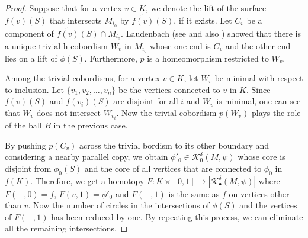 \documentclass[a4paper]{amsart}
\theoremstyle{definition}
\theoremstyle{remark}
\numberwithin{equation}{section}
\begin{document}
\begin{proof}
Suppose that for a vertex $v\in K$, we denote the lift of the surface $f(v)(S)$  that intersects $M_{i_0}$ by $\widetilde{f(v)}(S)$, if it exists. Let $C_v$ be a component of $\widetilde{f(v)}(S)\cap M_{i_0}$. Laudenbach (see \cite[Corollary II.4.2]{MR0356056} and also \cite[page 8]{hatcher1999spaces}) showed that  there is a unique trivial h-cobordism $W_v$ in $M_{i_0}$ whose  one end is $C_v$ and the other end lies on a lift of $\phi(S)$. Furthermore, $p$ is a homeomorphism restricted to $W_v$.

Among the trivial cobordisms, for a vertex $v\in K$, let $W_v$ be  minimal with respect to inclusion.  Let $\{v_1,v_2,\dots,v_n\}$ be the vertices connected to $v$ in $K$. Since $f(v)(S)$ and $f(v_i)(S)$ are disjoint for all $i$ and $W_v$ is minimal, one can see that $W_v$ does not intersect $W_{v_i}$. Now the trivial cobordism $p(W_v)$ plays the role of the ball $B$ in the previous case. 

By pushing $p(C_v)$ across the trivial bordism to its other boundary and considering a nearby parallel copy, we obtain $\phi'_0\in \mathcal{K}^{\delta}_{0}(M,\psi)$ whose core is disjoint from $\phi_0(S)$ and the core of all vertices that are connected to $\phi_0$ in $f(K)$.  Therefore, we get a homotopy $F:K\times [0,1]\to |\mathcal{K}^{\delta}_{\bullet}(M,\psi)|$ where $F(-,0)=f$,  $F(v,1)=\phi'_0$  and $F(-,1)$ is the same as $f$ on vertices other than $v$. Now the number of circles in the intersections of $\phi(S)$ and the vertices of $F(-,1)$ has been reduced by one. By repeating this process, we can eliminate all the remaining intersections. 
 \end{proof}

\end{document}
